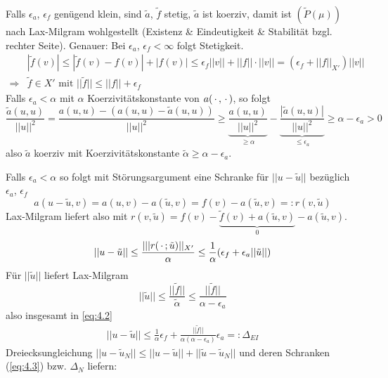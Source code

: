 \begin{bem}
Falls $\epsilon_a$, $\epsilon_f$ genügend klein, sind $\tilde{a}$, $\tilde{f}$ stetig, $\tilde{a}$ ist koerziv, damit ist $(\tilde{P}(\mu))$ nach Lax-Milgram wohlgestellt (Existenz \& Eindeutigkeit \& Stabilität bzgl. rechter Seite). Genauer: Bei $\epsilon_a$, $\epsilon_f < \infty$ folgt Stetigkeit.
\begin{align*}
 &|\tilde{f}(v)| \leq |\tilde{f}(v) - f(v) | + |f(v)| \leq \epsilon_f ||v|| + ||f|| \cdot ||v|| = (\epsilon_f + ||f||_{X'}) ||v|| \\
 \Rightarrow &\tilde{f} \in X' \text{ mit } ||\tilde{f}|| \leq ||f|| + \epsilon_f
\end{align*}
Falls $\epsilon_a < \alpha$ mit $\alpha$ Koerzivitätskonstante von $a(\,\cdot\,,\,\cdot\,)$, so folgt
\[
	\frac{\tilde{a}(u,u)}{||u||^2} = \frac{a(u,u)-(a(u,u) - \tilde{a}(u,u))}{||u||^2} \geq \underbrace{\frac{a(u,u)}{||u||^2}}_{\geq \alpha} - \underbrace{\frac{|\tilde{a}(u,u)|}{||u||^2}}_{\leq \epsilon_a} \geq \alpha - \epsilon_a > 0
\]
also $\tilde{a}$ koerziv mit Koerzivitätskonstante $\tilde{\alpha} \geq \alpha - \epsilon_a$.
\end{bem}

\begin{bem}
Falls $\epsilon_a < \alpha$ so folgt mit Störungsargument eine Schranke für $||u - \tilde{u}||$ bezüglich $\epsilon_a$, $\epsilon_f$
\[
	a(u - \tilde{u},v) = a(u,v) - a(\tilde{u},v) = f(v) - a(\tilde{u},v) =: r(v, \tilde{u})
\]
Lax-Milgram liefert also mit $r(v,\tilde{u}) = f(v) - \underbrace{\tilde{f}(v) + a(\tilde{u},v)}_{0} - a(\tilde{u},v)$.
\begin{align} \label{eq:4.2}
 || u- \tilde{u}|| \leq \frac{|||r(\,\cdot\,;\tilde{u})||_{X'}}{\alpha} \leq \frac{1}{\alpha} (\epsilon_f + \epsilon_a ||\tilde{u}||)
\end{align}
Für $||\tilde{u}||$ liefert Lax-Milgram
\[
	||\tilde{u}|| \leq \frac{||\tilde{f}||}{\tilde{\alpha}} \leq \frac{||\tilde{f}||}{\alpha - \epsilon_a}
\]
also insgesamt in \ref{eq:4.2}
\begin{align} \label{eq:4.3}
	|| u - \tilde{u}|| \leq \frac{1}{\alpha} \epsilon_f + \frac{||\tilde{f}||}{\alpha(\alpha - \epsilon_a)} \epsilon_a =: \Delta_{EI}
\end{align}
Dreiecksungleichung $||u-\tilde{u}_N|| \leq || u - \tilde{u}|| + ||\tilde{u} - \tilde{u}_N||$ und deren Schranken (\ref{eq:4.3}) bzw. $\Delta_N$ liefern:
\end{bem}

